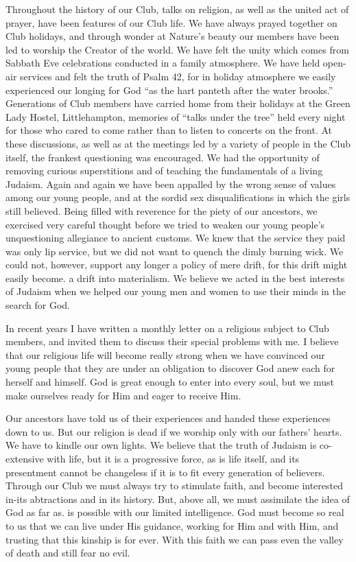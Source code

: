 Throughout the history of our Club, talks on religion,
as well as the united act of prayer, have been features of
our Club life. We have always prayed together on Club
holidays, and through wonder at Nature’s beauty our
members have been led to worship the Creator of the
world. We have felt the unity which comes from
Sabbath Eve celebrations conducted in a family atmosphere.
We have held open-air services and felt the truth
of Psalm 42, for in holiday atmosphere we easily experienced
our longing for God “as the hart panteth after the
water brooks.” Generations of Club members have
carried home from their holidays at the Green Lady
Hostel, Littlehampton, memories of “talks under the
tree” held every night for those who cared to come
rather than to listen to concerts on the front. At these
discussions, as well as at the meetings led by a variety of
people in the Club itself, the frankest questioning was
encouraged. We had the opportunity of removing curious
superstitions and of teaching the fundamentals of a living
Judaism. Again and again we have been appalled by
the wrong sense of values among our young people, and
at the sordid sex disqualifications in which the girls still
believed. Being filled with reverence for the piety of our
ancestors, we exercised very careful thought before we
tried to weaken our young people’s unquestioning allegiance
to ancient customs. We knew that the service they
paid was only lip service, but we did not want to quench
the dimly burning wick. We could not, however, support
any longer a policy of mere drift, for this drift might
easily become. a drift into materialism. We believe we
acted in the best interests of Judaism when we helped our
young men and women to use their minds in the search
for God.

In recent years I have written a monthly letter on a
religious subject to Club members, and invited them to
discuss their special problems with me. I believe that
our religious life will become really strong when we have
convinced our young people that they are under an
obligation to discover God anew each for herself and himself.
God is great enough to enter into every soul, but we
must make ourselves ready for Him and eager to receive
Him.

Our ancestors have told us of their experiences and
handed these experiences down to us. But our religion is
dead if we worship only with our fathers’ hearts. We
have to kindle our own lights. We believe that the truth
of Judaism is co-extensive with life, but it is a progressive
force, as is life itself, and its presentment cannot be
changeless if it is to fit every generation of believers.
Through our Club we must always try to stimulate faith,
and become interested in-its abtractions and in its history.
But, above all, we must assimilate the idea of God as far as.
is possible with our limited intelligence. God must
become so real to us that we can live under His guidance,
working for Him and with Him, and trusting that this
kinship is for ever. With this faith we can pass even the
valley of death and still fear no evil.
